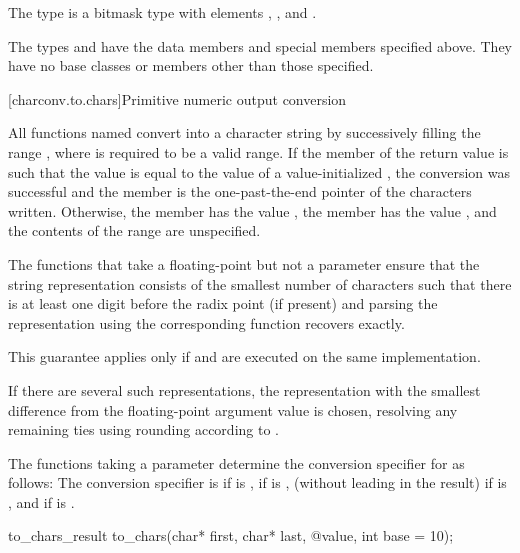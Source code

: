 \pnum
The type  is a bitmask type
with elements , , and .

\pnum
The types  and 
have the data members and special members specified above.
They have no base classes or members other than those specified.

[charconv.to.chars]{Primitive numeric output conversion}

\pnum
All functions named 
convert  into a character string
by successively filling the range
,
where  is required to be a valid range.
If the member 
of the return value
is such that the value
is equal to the value of a value-initialized ,
the conversion was successful
and the member 
is the one-past-the-end pointer of the characters written.
Otherwise,
the member  has the value ,
the member  has the value ,
and the contents of the range  are unspecified.

\pnum
The functions that take a floating-point 
but not a  parameter
ensure that the string representation
consists of the smallest number of characters
such that
there is at least one digit before the radix point (if present) and
parsing the representation using the corresponding  function
recovers  exactly.
\begin{note}
This guarantee applies only if
 and 
are executed on the same implementation.
\end{note}
If there are several such representations,
the representation with the smallest difference from
the floating-point argument value is chosen,
resolving any remaining ties using rounding according to
.

\pnum
The functions taking a  parameter
determine the conversion specifier for  as follows:
The conversion specifier is
 if  is ,
 if  is ,
 (without leading  in the result)
if  is ,
and
 if  is .

\begin{indexed}{}
\begin{itemdecl}
to_chars_result to_chars(char* first, char* last, @\seebelow@ value, int base = 10);
\end{itemdecl}
\end{indexed}

